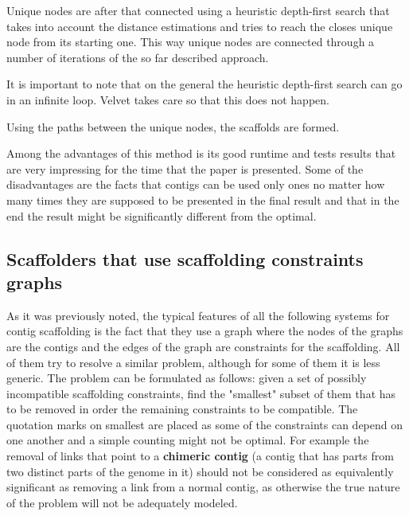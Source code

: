 \documentclass[11pt]{article}
\begin{document}
Unique nodes are after that connected using a heuristic depth-first search that
takes into account the distance estimations and tries to reach the closes unique
node from its starting one. This way unique nodes are connected through a number
of iterations of the so far described approach.

It is important to note that on the general the heuristic depth-first search can
go in an infinite loop. Velvet takes care so that this does not happen.

Using the paths between the unique nodes, the scaffolds are formed.

Among the advantages of this method is its good runtime and tests results that
are very impressing for the time that the paper is presented. Some of the
disadvantages are the facts that contigs can be used only ones no matter how many
times they are supposed to be presented in the final result and that in the end
the result might be significantly different from the optimal.



\subsection{Scaffolders that use scaffolding constraints graphs} %
\label{sub:Scaffolders that use scaffolding constraints graphs}
As it was previously noted, the typical features of all the following
systems for contig scaffolding is the fact that they use a graph where the nodes
of the graphs are the contigs and the edges of the graph are constraints for the
scaffolding. All of them try to resolve a similar problem, although for some of
them it is less generic. The problem can be formulated as follows: given a set
of possibly incompatible scaffolding constraints, find the "smallest" subset of
them that has to be removed in order the remaining constraints to be compatible.
The quotation marks on smallest are placed as some of the constraints can depend
on one another and a simple counting might not be optimal. For example the
removal of links that point to a \textbf{chimeric contig} (a contig that has
parts from two distinct parts of the genome in it) should not be considered as
equivalently significant as removing a link from a normal contig, as otherwise
the true nature of the problem will not be adequately modeled.
\end{document}
